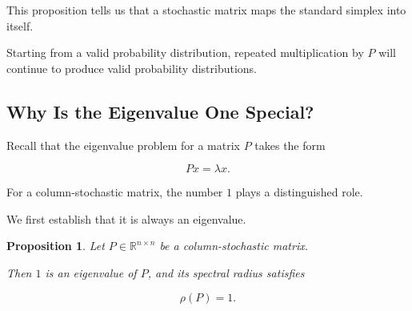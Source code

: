 \documentclass[11pt,a4paper]{article}
\newtheorem{proposition}[theorem]{Proposition}
\theoremstyle{definition}
\theoremstyle{remark}
\begin{document}
This proposition tells us
that a stochastic matrix
maps the standard simplex
into itself.

Starting from a valid
probability distribution,
repeated multiplication by
$P$ will continue to
produce valid probability
distributions.

\subsection{Why Is the Eigenvalue One Special?}

Recall that the eigenvalue
problem for a matrix $P$
takes the form

\[
Px=\lambda x.
\]

For a column-stochastic
matrix, the number $1$
plays a distinguished role.

We first establish that
it is always an eigenvalue.

\begin{proposition}
Let $P\in\mathbb{R}^{n\times n}$
be a column-stochastic matrix.

Then $1$ is an eigenvalue of $P$,
and its spectral radius satisfies

\[
\boxed{\rho(P)=1.}
\]

\end{proposition}
\end{document}
